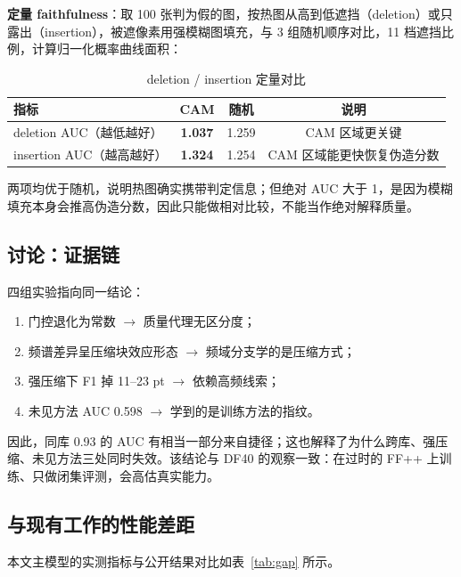 \textbf{定量 faithfulness}：取 100 张判为假的图，按热图从高到低遮挡（deletion）或只露出（insertion），被遮像素用强模糊图填充，与 3 组随机顺序对比，11 档遮挡比例，计算归一化概率曲线面积：

\begin{table}[H]
\centering
\caption{deletion / insertion 定量对比}
\label{tab:faith}
\small
\begin{tabular}{lccc}
\toprule
指标 & CAM & 随机 & 说明 \\
\midrule
deletion AUC（越低越好） & \textbf{1.037} & 1.259 & CAM 区域更关键 \\
insertion AUC（越高越好） & \textbf{1.324} & 1.254 & CAM 区域能更快恢复伪造分数 \\
\bottomrule
\end{tabular}
\end{table}

两项均优于随机，说明热图确实携带判定信息；但绝对 AUC 大于 1，是因为模糊填充本身会推高伪造分数，因此只能做相对比较，不能当作绝对解释质量。

\subsection{讨论：证据链}

四组实验指向同一结论：

\begin{enumerate}
  \item 门控退化为常数 $\rightarrow$ 质量代理无区分度；
  \item 频谱差异呈压缩块效应形态 $\rightarrow$ 频域分支学的是压缩方式；
  \item 强压缩下 F1 掉 11--23 pt $\rightarrow$ 依赖高频线索；
  \item 未见方法 AUC 0.598 $\rightarrow$ 学到的是训练方法的指纹。
\end{enumerate}

因此，同库 0.93 的 AUC 有相当一部分来自捷径；这也解释了为什么跨库、强压缩、未见方法三处同时失效。该结论与 DF40 的观察一致：在过时的 FF++ 上训练、只做闭集评测，会高估真实能力。

\subsection{与现有工作的性能差距}

本文主模型的实测指标与公开结果对比如表~\ref{tab:gap} 所示。

